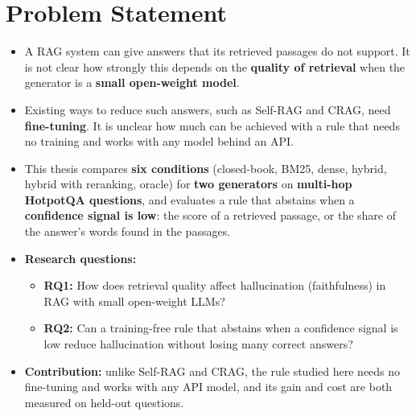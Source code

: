 \chapter{Problem Statement}\label{chap:problem}

\begin{itemize}
\item A RAG system can give answers that its retrieved passages do not support. It is not clear
  how strongly this depends on the \textbf{quality of retrieval} when the generator is a
  \textbf{small open-weight model}.
\item Existing ways to reduce such answers, such as Self-RAG and CRAG, need \textbf{fine-tuning}.
  It is unclear how much can be achieved with a rule that needs no training and works with any
  model behind an API.
\item This thesis compares \textbf{six conditions} (closed-book, BM25, dense, hybrid, hybrid with
  reranking, oracle) for \textbf{two generators} on \textbf{multi-hop HotpotQA questions}, and
  evaluates a rule that abstains when a \textbf{confidence signal is low}: the score of a retrieved
  passage, or the share of the answer's words found in the passages.
\item \textbf{Research questions:}
  \begin{itemize}
  \item \textbf{RQ1:} How does retrieval quality affect hallucination (faithfulness) in RAG with
    small open-weight LLMs?
  \item \textbf{RQ2:} Can a training-free rule that abstains when a confidence signal is low
    reduce hallucination without losing many correct answers?
  \end{itemize}
\item \textbf{Contribution:} unlike Self-RAG and CRAG, the rule studied here needs no fine-tuning
  and works with any API model, and its gain and cost are both measured on held-out questions.
\end{itemize}
